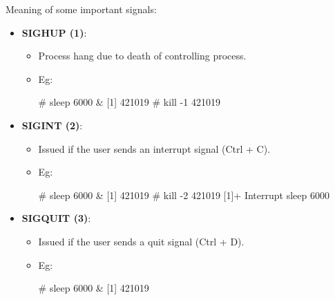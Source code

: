 \begin{flushleft}
\begin{itemize}
\begin{itemize}
			Meaning of some important signals:
			\begin{itemize}
				\item \textbf{SIGHUP (1)}: 
				\begin{itemize}
					\item Process hang due to death of controlling process.
					\item Eg:
					\begin{tcolorbox}[breakable,notitle,boxrule=-0pt,colback=black,colframe=black]
						\color{green}
						\font=9pt
						\# sleep 6000 \&
						\newline
						\color{white}
						[1] 421019
						\newline
						\newline
						\color{green}						
						\# kill -1 421019
						\font=4pt
					\end{tcolorbox}
				\end{itemize}
				\item \textbf{SIGINT (2)}: 
				\begin{itemize}
					\item Issued if the user sends an interrupt signal (Ctrl + C).
					\item Eg:
					\begin{tcolorbox}[breakable,notitle,boxrule=-0pt,colback=black,colframe=black]
						\color{green}
						\fontdimen2\font=9pt
						\# sleep 6000 \&
						\newline
						\color{white}
						[1] 421019
						\newline
						\newline
						\color{green}						
						\# kill -2 421019
						\newline
						\color{white}
						[1]+  Interrupt               sleep 6000
						\fontdimen2\font=4pt
					\end{tcolorbox}
				\end{itemize}
				\newpage
				\item \textbf{SIGQUIT (3)}: 
				\begin{itemize}
					\item Issued if the user sends a quit signal (Ctrl + D).
					\item Eg:
					\begin{tcolorbox}[breakable,notitle,boxrule=-0pt,colback=black,colframe=black]
						\color{green}
						\font=9pt
						\# sleep 6000 \&
						\newline
						\color{white}
						[1] 421019
						\newline

\end{tcolorbox}
\end{itemize}
\end{itemize}
\end{itemize}
\end{itemize}
\end{flushleft}
